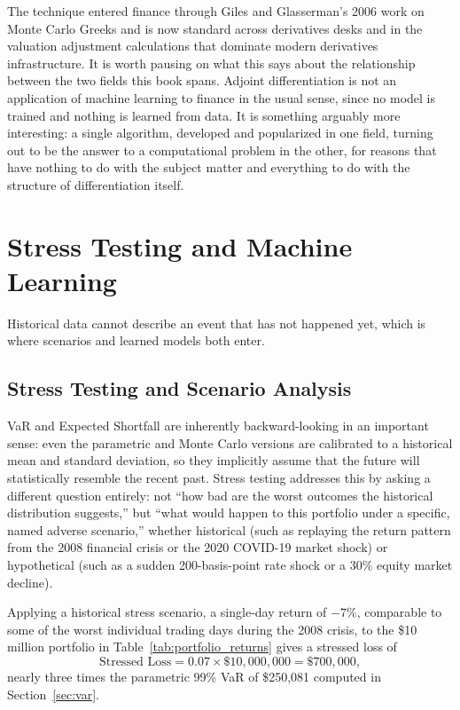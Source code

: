 \documentclass[../ai_in_finance]{subfiles}
\begin{document}
The technique entered finance through Giles and Glasserman's 2006 work on Monte Carlo Greeks and is now standard across derivatives desks and in the valuation adjustment calculations that dominate modern derivatives infrastructure. It is worth pausing on what this says about the relationship between the two fields this book spans. Adjoint differentiation is not an application of machine learning to finance in the usual sense, since no model is trained and nothing is learned from data. It is something arguably more interesting: a single algorithm, developed and popularized in one field, turning out to be the answer to a computational problem in the other, for reasons that have nothing to do with the subject matter and everything to do with the structure of differentiation itself.

\section{Stress Testing and Machine Learning}

Historical data cannot describe an event that has not happened yet, which is where scenarios and learned models both enter.

\subsection{Stress Testing and Scenario Analysis}
\label{sec:stress-testing}

VaR and Expected Shortfall are inherently backward-looking in an important sense: even the parametric and Monte Carlo versions are calibrated to a historical mean and standard deviation, so they implicitly assume that the future will statistically resemble the recent past.
Stress testing addresses this by asking a different question entirely: not ``how bad are the worst outcomes the historical distribution suggests,'' but ``what would happen to this portfolio under a specific, named adverse scenario,'' whether historical (such as replaying the return pattern from the 2008 financial crisis or the 2020 COVID-19 market shock) or hypothetical (such as a sudden 200-basis-point rate shock or a 30\% equity market decline).

Applying a historical stress scenario, a single-day return of $-7\%$, comparable to some of the worst individual trading days during the 2008 crisis, to the \$10 million portfolio in Table~\ref{tab:portfolio_returns} gives a stressed loss of
\begin{equation*}
\text{Stressed Loss} = 0.07 \times \$10{,}000{,}000 = \$700{,}000,
\end{equation*}
nearly three times the parametric 99\% VaR of \$250,081 computed in Section~\ref{sec:var}.
\end{document}
